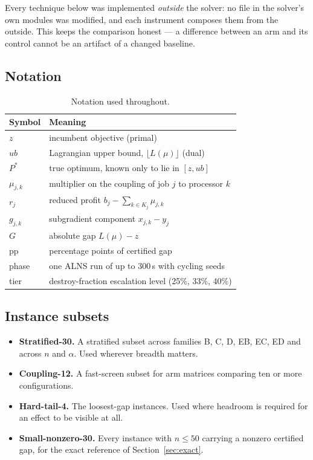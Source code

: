 \documentclass[11pt,a4paper]{article}
\newcommand{\Kj}{\ensuremath{K_j}}
\begin{document}
Every technique below was implemented \emph{outside} the solver: no file in the
solver's own modules was modified, and each instrument composes them from the
outside. This keeps the comparison honest --- a difference between an arm and its
control cannot be an artifact of a changed baseline.

\subsection{Notation}

\begin{table}[htbp]
\centering
\caption{Notation used throughout.}
\label{tab:notation}
\begin{tabular}{ll}
\toprule
Symbol & Meaning \\
\midrule
$z$ & incumbent objective (primal) \\
$ub$ & Lagrangian upper bound, $\lfloor L(\mu)\rfloor$ (dual) \\
$P^\ast$ & true optimum, known only to lie in $[z,ub]$ \\
$\mu_{j,k}$ & multiplier on the coupling of job $j$ to processor $k$ \\
$r_j$ & reduced profit $b_j-\sum_{k\in \Kj}\mu_{j,k}$ \\
$g_{j,k}$ & subgradient component $x_{j,k}-y_j$ \\
$G$ & absolute gap $L(\mu)-z$ \\
pp & percentage points of certified gap \\
phase & one ALNS run of up to 300\,s with cycling seeds \\
tier & destroy-fraction escalation level (25\%, 33\%, 40\%) \\
\bottomrule
\end{tabular}
\end{table}

\subsection{Instance subsets}

\begin{itemize}
  \item \textbf{Stratified-30.} A stratified subset across families B, C, D, EB,
    EC, ED and across $n$ and $\alpha$. Used wherever breadth matters.
  \item \textbf{Coupling-12.} A fast-screen subset for arm matrices comparing ten
    or more configurations.
  \item \textbf{Hard-tail-4.} The loosest-gap instances. Used where headroom is
    required for an effect to be visible at all.
  \item \textbf{Small-nonzero-30.} Every instance with $n\le 50$ carrying a
    nonzero certified gap, for the exact reference of Section~\ref{sec:exact}.
\end{itemize}
\end{document}
